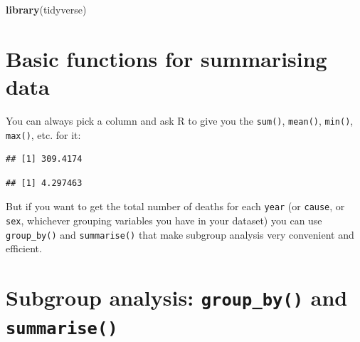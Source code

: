 \documentclass[]{book}
\makeatletter
\newenvironment{Shaded}{\begin{snugshade}}{\end{snugshade}}
\newcommand{\KeywordTok}[1]{\textcolor[rgb]{0.13,0.29,0.53}{\textbf{#1}}}
\newcommand{\StringTok}[1]{\textcolor[rgb]{0.31,0.60,0.02}{#1}}
\newcommand{\OperatorTok}[1]{\textcolor[rgb]{0.81,0.36,0.00}{\textbf{#1}}}
\newcommand{\NormalTok}[1]{#1}
\newenvironment{kframe}{%
\medskip{}
\setlength{\fboxsep}{.8em}
 \def\at@end@of@kframe{}%
 \ifinner\ifhmode%
  \def\at@end@of@kframe{\end{minipage}}%
  \begin{minipage}{\columnwidth}%
 \fi\fi%
 \def\FrameCommand##1{\hskip\@totalleftmargin \hskip-\fboxsep
 \colorbox{shadecolor}{##1}\hskip-\fboxsep
     \hskip-\linewidth \hskip-\@totalleftmargin \hskip\columnwidth}%
 \MakeFramed {\advance\hsize-\width
   \@totalleftmargin\z@ \linewidth\hsize
   \@setminipage}}%
 {\par\unskip\endMakeFramed%
 \at@end@of@kframe}
\renewenvironment{Shaded}{\begin{kframe}}{\end{kframe}}
\makeatother
\begin{document}
\begin{Shaded}
\begin{Highlighting}[]
\KeywordTok{library}\NormalTok{(tidyverse)}
\end{Highlighting}
\end{Shaded}

\section{Basic functions for summarising
data}\label{basic-functions-for-summarising-data}

You can always pick a column and ask R to give you the \texttt{sum()},
\texttt{mean()}, \texttt{min()}, \texttt{max()}, etc. for it:

\begin{Shaded}
\end{Shaded}

\begin{verbatim}
## [1] 309.4174
\end{verbatim}

\begin{Shaded}
\end{Shaded}

\begin{verbatim}
## [1] 4.297463
\end{verbatim}

But if you want to get the total number of deaths for each \texttt{year}
(or \texttt{cause}, or \texttt{sex}, whichever grouping variables you
have in your dataset) you can use \texttt{group\_by()} and
\texttt{summarise()} that make subgroup analysis very convenient and
efficient.

\section{\texorpdfstring{Subgroup analysis: \texttt{group\_by()} and
\texttt{summarise()}}{Subgroup analysis: group\_by() and summarise()}}\label{subgroup-analysis-group_by-and-summarise}
\end{document}
